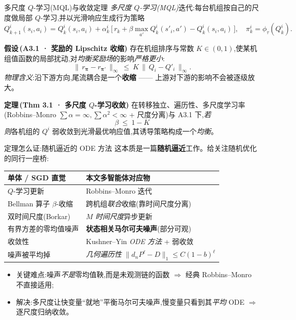 \documentclass[aspectratio=169,11pt,UTF8]{ctexbeamer}
\newcommand{\bpi}{\bm{\pi}}
\newcommand{\emphb}[1]{\textcolor{myred}{\textbf{#1}}}
\newenvironment{thmbox}[1]{\begin{block}{\color{myred}\bfseries 定理\,(#1)}}{\end{block}}
\newenvironment{asmbox}[1]{\begin{block}{\color{mygreen}\bfseries 假设\,(#1)}}{\end{block}}
\begin{document}
\begin{frame}{多尺度 $Q$-学习(MQL)与收敛定理}
\small
\emph{多尺度 $Q$-学习(MQL)}迭代:每台机组按自己的尺度做局部 $Q$-学习,并以光滑响应生成行为策略
\[
Q^{i}_{k+1}(s_i,a_i)=Q^{i}_{k}(s_i,a_i)+\alpha^i_k\,\Big[\,r_k+\beta\max_{a'}Q^i_k(s'_i,a')-Q^i_k(s_i,a_i)\,\Big],\quad \pi^i_k=\phi_\tau(Q^i_k).
\]
\begin{asmbox}{A3.1 · 奖励的 Lipschitz 收缩}
存在机组排序与常数 $K\in(0,1)$,使某机组值函数的局部扰动,对\emph{均衡奖励场}的影响\emph{严格更小}:
\[
\big\|\,r_{\bpi}-r_{\bpi'}\,\big\|_{\infty}\ \le\ K\,\big\|\,Q_i-Q'_i\,\big\|_{\infty}.
\]
\emph{物理含义}:沿下游方向,尾流耦合是一个\emphb{收缩} —— 上游对下游的影响不会被逐级放大。
\end{asmbox}
\begin{thmbox}{Thm 3.1 · 多尺度 $Q$-学习收敛}
在转移独立、遍历性、多尺度学习率(Robbins--Monro $\sum\alpha=\infty,\sum\alpha^2<\infty$ + 尺度分离)与 A3.1 下,\emph{若}
\[
\boxed{\ \beta\ \le\ 1-K\ }
\]
\emph{则}各机组的 $Q^i$ 弱收敛到光滑最优响应值,其诱导策略构成一个\emph{均衡}。
\end{thmbox}
\end{frame}

\begin{frame}{定理怎么证:随机逼近的 ODE 方法}
\small
这本质是一篇\emphb{随机逼近}工作。给关注随机优化的同行一座桥:
\begin{center}\renewcommand{\arraystretch}{1.25}
\begin{tabular}{@{}ll@{}}
\toprule
\textbf{单体 / SGD 直觉} & \textbf{本文多智能体对应物} \\
\midrule
$Q$-学习更新 & Robbins--Monro 迭代 \\
Bellman 算子 $\beta$-收缩 & 跨机组\emph{联合}收缩(靠时间尺度分离) \\
双时间尺度(Borkar) & \emph{$M$ 时间尺度}异步更新 \\
有界方差的零均值噪声 & \emphb{状态相关马尔可夫噪声}(部分可观) \\
收敛性 & Kushner--Yin \emph{ODE 方法} + 弱收敛 \\
噪声被平均掉 & \emph{几何遍历性} $\|d_nP^\ell-D\|_1\le C(1-b)^\ell$ \\
\bottomrule
\end{tabular}
\end{center}
\vspace{1mm}
\begin{itemize}\setlength\itemsep{2pt}
  \item 关键难点:噪声\emph{不是}零均值鞅,而是未观测链的函数 $\Rightarrow$ 经典 Robbins--Monro 不直接适用;
  \item 解决:多尺度让快变量“就地”平衡马尔可夫噪声,慢变量只看到其\emph{平均} ODE $\Rightarrow$ 逐尺度归纳收敛。
\end{itemize}
\end{frame}
\end{document}
